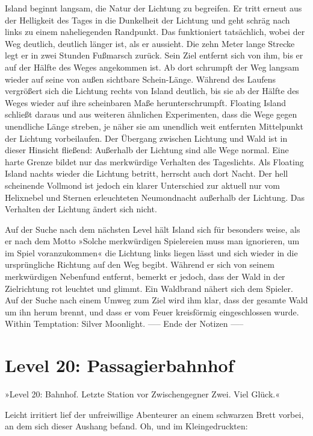     Island beginnt langsam, die Natur der Lichtung zu begreifen. Er tritt erneut aus der Helligkeit des Tages in die Dunkelheit der Lichtung und geht schräg nach links zu einem naheliegenden Randpunkt. Das funktioniert tatsächlich, wobei der Weg deutlich, deutlich länger ist, als er aussieht. Die zehn Meter lange Strecke legt er in zwei Stunden Fußmarsch zurück. Sein Ziel entfernt sich von ihm, bis er auf der Hälfte des Weges angekommen ist. Ab dort schrumpft der Weg langsam wieder auf seine von außen sichtbare Schein-Länge. Während des Laufens vergrößert sich die Lichtung rechts von Island deutlich, bis sie ab der Hälfte des Weges wieder auf ihre scheinbaren Maße herunterschrumpft. Floating Island schließt daraus und aus weiteren ähnlichen Experimenten, dass die Wege gegen unendliche Länge streben, je näher sie am unendlich weit entfernten Mittelpunkt der Lichtung vorbeilaufen. Der Übergang zwischen Lichtung und Wald ist in dieser Hinsicht fließend: Außerhalb der Lichtung sind alle Wege normal. Eine harte Grenze bildet nur das merkwürdige Verhalten des Tageslichts.
    Als Floating Island nachts wieder die Lichtung betritt, herrscht auch dort Nacht. Der hell scheinende Vollmond ist jedoch ein klarer Unterschied zur aktuell nur vom Helixnebel und Sternen erleuchteten Neumondnacht außerhalb der Lichtung. Das Verhalten der Lichtung ändert sich nicht.

    Auf der Suche nach dem nächsten Level hält Island sich für besonders weise, als er nach dem Motto »Solche merkwürdigen Spielereien muss man ignorieren, um im Spiel voranzukommen« die Lichtung links liegen lässt und sich wieder in die ursprüngliche Richtung auf den Weg begibt. Während er sich von seinem merkwürdigen Nebenfund entfernt, bemerkt er jedoch, dass der Wald in der Zielrichtung rot leuchtet und glimmt. Ein Waldbrand nähert sich dem Spieler. Auf der Suche nach einem Umweg zum Ziel wird ihm klar, dass der gesamte Wald um ihn herum brennt, und dass er vom Feuer kreisförmig eingeschlossen wurde.
    Within Temptation: Silver Moonlight.
----- Ende der Notizen -----





\section{Level 20: Passagierbahnhof}

»Level 20: Bahnhof. Letzte Station vor Zwischengegner Zwei. Viel Glück.«

Leicht irritiert lief der unfreiwillige Abenteurer an einem schwarzen Brett vorbei, an dem sich dieser Aushang befand. Oh, und im Kleingedruckten:

